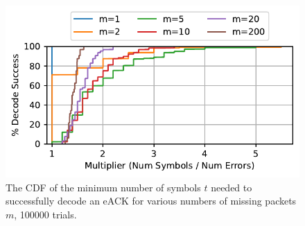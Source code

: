 \begin{figure}[t]
    \centering
    \includegraphics[width=0.9\linewidth]{figures/quack_multiplier.pdf}
    \caption{The CDF of the minimum number of symbols $t$ needed to successfully
    decode an eACK for various numbers of missing packets $m$, 100000 trials.}
    \label{fig:iblt-quack}
\end{figure}